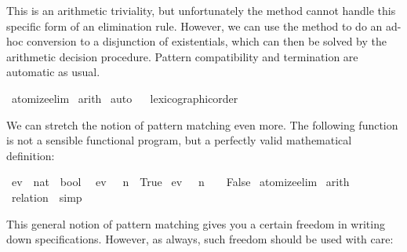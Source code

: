 \begin{isabellebody}
\begin{isamarkuptxt}
  This is an arithmetic triviality, but unfortunately the
   method cannot handle this specific form of an
  elimination rule. However, we can use the method  to do an ad-hoc conversion to a disjunction of
  existentials, which can then be solved by the arithmetic decision procedure.
  Pattern compatibility and termination are automatic as usual.%
\end{isamarkuptxt}%
\isamarkuptrue%
%
\endisatagproof
{\isafoldproof}%
%
\isadelimproof
%
\endisadelimproof
%
\isadelimML
%
\endisadelimML
%
\isatagML
%
\endisatagML
{\isafoldML}%
%
\isadelimML
%
\endisadelimML
%
\isadelimproof
%
\endisadelimproof
%
\isatagproof
{}\isamarkupfalse%
\ atomize{\isacharunderscore}elim\isanewline
{}\isamarkupfalse%
\ arith\isanewline
{}\isamarkupfalse%
\ auto\isanewline
{}\isamarkupfalse%
%
\endisatagproof
{\isafoldproof}%
%
\isadelimproof
%
\endisadelimproof
\isanewline
{}\isamarkupfalse%
%
\isadelimproof
\ %
\endisadelimproof
%
\isatagproof
{}\isamarkupfalse%
\ lexicographic{\isacharunderscore}order%
\endisatagproof
{\isafoldproof}%
%
\isadelimproof
%
\endisadelimproof
%
\begin{isamarkuptext}%
We can stretch the notion of pattern matching even more. The
  following function is not a sensible functional program, but a
  perfectly valid mathematical definition:%
\end{isamarkuptext}%
\isamarkuptrue%
\isamarkupfalse%
\ ev\ {\isacharcolon}{\isacharcolon}\ {\isachardoublequoteopen}nat\ {\isasymRightarrow}\ bool{\isachardoublequoteclose}\isanewline
{}\isanewline
\ \ {\isachardoublequoteopen}ev\ {\isacharparenleft}{}\ {\isacharasterisk}\ n{\isacharparenright}\ {\isacharequal}\ True{\isachardoublequoteclose}\isanewline
{\isacharbar}\ {\isachardoublequoteopen}ev\ {\isacharparenleft}{}\ {\isacharasterisk}\ n\ {\isacharplus}\ {}{\isacharparenright}\ {\isacharequal}\ False{\isachardoublequoteclose}\isanewline
%
\isadelimproof
%
\endisadelimproof
%
\isatagproof
{}\isamarkupfalse%
\ atomize{\isacharunderscore}elim\isanewline
{}\isamarkupfalse%
\ arith{\isacharplus}%
\endisatagproof
{\isafoldproof}%
%
\isadelimproof
\isanewline
%
\endisadelimproof
{}\isamarkupfalse%
%
\isadelimproof
\ %
\endisadelimproof
%
\isatagproof
{}\isamarkupfalse%
\ {\isacharparenleft}relation\ {\isachardoublequoteopen}{\isacharbraceleft}{\isacharbraceright}{\isachardoublequoteclose}{\isacharparenright}\ simp%
\endisatagproof
{\isafoldproof}%
%
\isadelimproof
%
\endisadelimproof
%
\begin{isamarkuptext}%
This general notion of pattern matching gives you a certain freedom
  in writing down specifications. However, as always, such freedom should
  be used with care:


\end{isamarkuptext}
\end{isabellebody}
